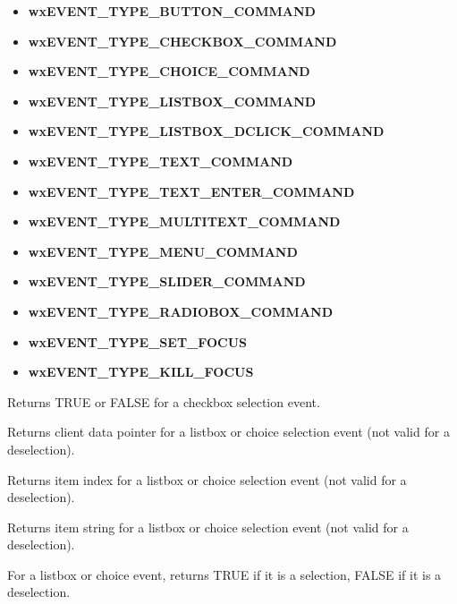 \begin{itemize}\itemsep=0pt
\item {\bf wxEVENT\_TYPE\_BUTTON\_COMMAND}
\item {\bf wxEVENT\_TYPE\_CHECKBOX\_COMMAND}
\item {\bf wxEVENT\_TYPE\_CHOICE\_COMMAND}
\item {\bf wxEVENT\_TYPE\_LISTBOX\_COMMAND}
\item {\bf wxEVENT\_TYPE\_LISTBOX\_DCLICK\_COMMAND}
\item {\bf wxEVENT\_TYPE\_TEXT\_COMMAND}
\item {\bf wxEVENT\_TYPE\_TEXT\_ENTER\_COMMAND}
\item {\bf wxEVENT\_TYPE\_MULTITEXT\_COMMAND}
\item {\bf wxEVENT\_TYPE\_MENU\_COMMAND}
\item {\bf wxEVENT\_TYPE\_SLIDER\_COMMAND}
\item {\bf wxEVENT\_TYPE\_RADIOBOX\_COMMAND}
\item {\bf wxEVENT\_TYPE\_SET\_FOCUS}
\item {\bf wxEVENT\_TYPE\_KILL\_FOCUS}
\end{itemize}



Returns TRUE or FALSE for a checkbox selection event.



Returns client data pointer for a listbox or choice selection event
(not valid for a deselection).



Returns item index for a listbox or choice selection event (not valid for
a deselection).



Returns item string for a listbox or choice selection event (not valid for
a deselection).



For a listbox or choice event, returns TRUE if it is a selection, FALSE if it
is a deselection.




